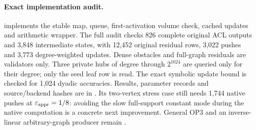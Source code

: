\paragraph{Exact implementation audit.}
 implements the stable map, queue, first-activation
volume check, cached updates and arithmetic wrapper. The full audit checks
826 complete original ACL outputs and 3,848 intermediate states, with
12,452 original residual rows, 3,022 pushes and 3,773 degree-weighted
updates. Dense obstacles and full-graph residuals are validators only.
Three private hubs of degree through $2^{1024}$ are queried only for
their degree; only the seed leaf row is read. The exact symbolic update
bound is checked for 1,024 dyadic accuracies. Results, parameter records
and source/backend hashes are in .
Its two-vertex stress case still needs 1,744 native pushes at
$\varepsilon_{\mathrm{appr}}=1/8$: avoiding the slow full-support constant mode during
the native computation is a concrete next improvement. General OP3 and
an inverse-linear arbitrary-graph producer remain \statusopen.
